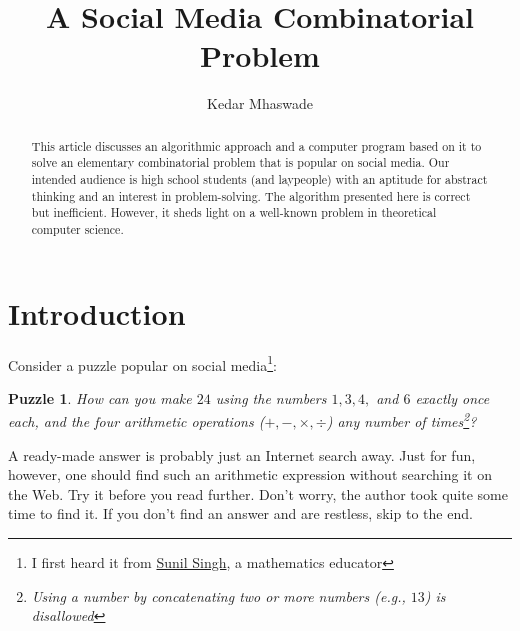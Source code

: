 \documentclass[english,smartquotes]{hgbarticle}
\newtheorem{question}{Puzzle}
\begin{document}

\author{
	Kedar Mhaswade\\ 
}
\title{A Social Media Combinatorial Problem}
\date{}

\maketitle

\begin{abstract}\noindent
This article discusses an algorithmic approach and a computer program based on it to solve an elementary combinatorial problem that is popular on social media. Our intended audience is high school students (and laypeople) with an aptitude for abstract thinking and an interest in problem-solving. The algorithm presented here is correct but inefficient. However, it sheds light on a well-known problem in theoretical computer science.
\end{abstract}


\section{Introduction}

Consider a puzzle popular on social media\footnote{I first heard it from \href{https://sunilsingh-42118.medium.com/}{Sunil Singh}, a mathematics educator}:

\begin{question}
\label{puzzle1}
How can you make $24$ using the numbers $1, 3, 4,$ and $6$ exactly once each, and the four arithmetic operations ($+, -, \times, \div$) any number of times\footnote{Using a number by concatenating two or more numbers (e.g., $13$) is disallowed}?
\end{question}

A ready-made answer is probably just an Internet search away. Just for fun, however, one should find such an arithmetic expression without searching it on the Web. Try it before you read further. Don't worry, the author took quite some time to find it. If you don't find an answer and are restless, skip to the end.
\end{document}
